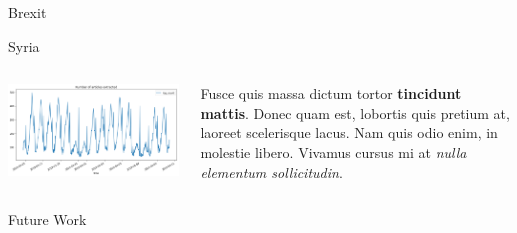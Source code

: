\documentclass[final,8pt]{beamer} %
\newlength{\twocolwid}
\begin{document}
\begin{frame}[t]
\begin{columns}[t]
\begin{column}{\twocolwid}
\begin{block}{Brexit}
\end{block}


\begin{block}{Syria}
    \begin{columns}[onlytextwidth]
        \begin{column}{.45\textwidth}
            \includegraphics[width=0.8\linewidth]{log_extraction.png} 
        \end{column}
        \begin{column}{.55\textwidth}
            Fusce quis massa dictum tortor \textbf{tincidunt mattis}. Donec quam est, lobortis quis pretium at, laoreet scelerisque lacus. Nam quis odio enim, in molestie libero. Vivamus cursus mi at \textit{nulla elementum sollicitudin}.
        \end{column}
    \end{columns}
\end{block}


\begin{block}{Future Work {}}

    \small{} \\
    
\end{block}



\end{column}
\end{columns}
\end{frame}
\end{document}
